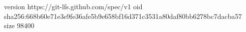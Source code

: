version https://git-lfs.github.com/spec/v1
oid sha256:668b60e71e3e9fe36afe5b9e658bf16d371c3531a80daf80bb6278bc7dacba57
size 98400
